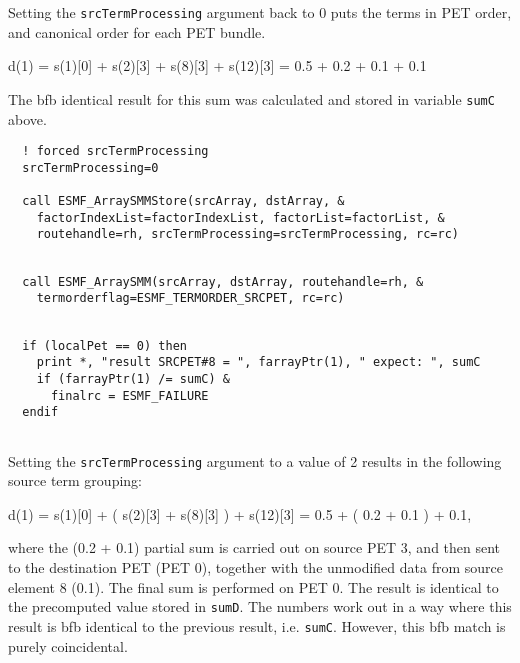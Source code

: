
   Setting the {\tt srcTermProcessing} argument back to 0 puts the terms in 
   PET order, and canonical order for each PET bundle.
  
       d(1) = s(1)[0] + s(2)[3] + s(8)[3] + s(12)[3] = 0.5 + 0.2 + 0.1 + 0.1
  
   The bfb identical result for this sum was calculated and stored in variable
   {\tt sumC} above. 

 \begin{verbatim}
  ! forced srcTermProcessing
  srcTermProcessing=0
  
  call ESMF_ArraySMMStore(srcArray, dstArray, &
    factorIndexList=factorIndexList, factorList=factorList, &
    routehandle=rh, srcTermProcessing=srcTermProcessing, rc=rc)
 
\end{verbatim}
 

 \begin{verbatim}
  call ESMF_ArraySMM(srcArray, dstArray, routehandle=rh, &
    termorderflag=ESMF_TERMORDER_SRCPET, rc=rc)
 
\end{verbatim}
 

 \begin{verbatim}
  if (localPet == 0) then
    print *, "result SRCPET#8 = ", farrayPtr(1), " expect: ", sumC
    if (farrayPtr(1) /= sumC) &
      finalrc = ESMF_FAILURE
  endif
 
\end{verbatim}
 

   Setting the {\tt srcTermProcessing} argument to a value of 2 results in the 
   following source term grouping:
  
       d(1) = s(1)[0] + ( s(2)[3] + s(8)[3] ) + s(12)[3]
            = 0.5 + ( 0.2 + 0.1 ) + 0.1,
  
   where the (0.2 + 0.1) partial sum is carried out on source PET 3, and
   then sent to the destination PET (PET 0), together with the unmodified data 
   from source element 8 (0.1). The final sum is performed on PET 0. The
   result is identical to the precomputed value stored in {\tt sumD}. The 
   numbers work out in a way where this result is bfb identical to the
   previous result, i.e. {\tt sumC}. However, this bfb match is purely 
   coincidental. 

